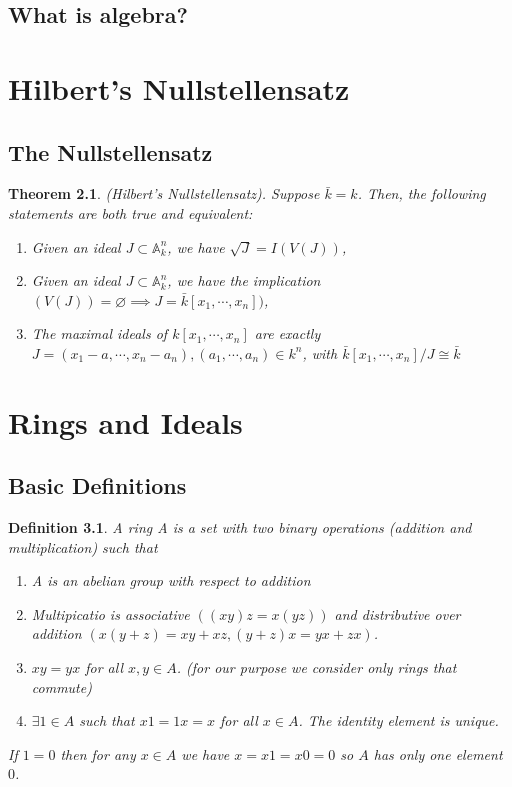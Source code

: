 \documentclass[]{report}
\newtheorem{theorem}{Theorem}[section]
\newtheorem{defn}[theorem]{Definition}
\begin{document}
\section{What is algebra?}




\chapter{Hilbert's Nullstellensatz}
\section{The Nullstellensatz}

\begin{theorem}
    (Hilbert's Nullstellensatz). Suppose $\bar{k} = k$. Then, the following statements are both true and equivalent:
    \begin{enumerate}
        \item Given an ideal $J\subset \mathbb{A}^n_k$, we have $\sqrt{J} = I(V(J))$,
        \item Given an ideal $J\subset \mathbb{A}^n_k$, we have the implication $(V(J)) = \varnothing \implies J = \bar{k}[x_1,\cdots,x_n])$,
        \item The maximal ideals of $k[x_1,\cdots,x_n]$ are exactly $J = (x_1-a,\cdots, x_n-a_n), (a_1,\cdots,a_n)\in k^n$, with $\bar{k}[x_1,\cdots,x_n]/J \cong \bar{k}$
    \end{enumerate}
\end{theorem}

\chapter{Rings and Ideals}
\section{Basic Definitions}
\begin{defn} 
    A ring A is a set with two binary operations (addition and multiplication) such that
\begin{enumerate}
    \item A is an abelian group with respect to addition
    \item Multipicatio is associative $((xy)z = x(yz))$ and distributive over addition $(x(y+z) = xy+xz, (y+z)x = yx + zx)$.  
    \item $xy=yx$ for all $x,y\in A$. (for our purpose we consider only rings that commute)
    \item $\exists 1\in A$ such that $x1 = 1x = x$ for all $x\in A$. 
The identity element is unique. 
\end{enumerate}

If $1=0$ then for any $x\in A$ we have $x=x1=x0 =0$ so $A$ has only one element $0$.
\end{defn}
\end{document}
